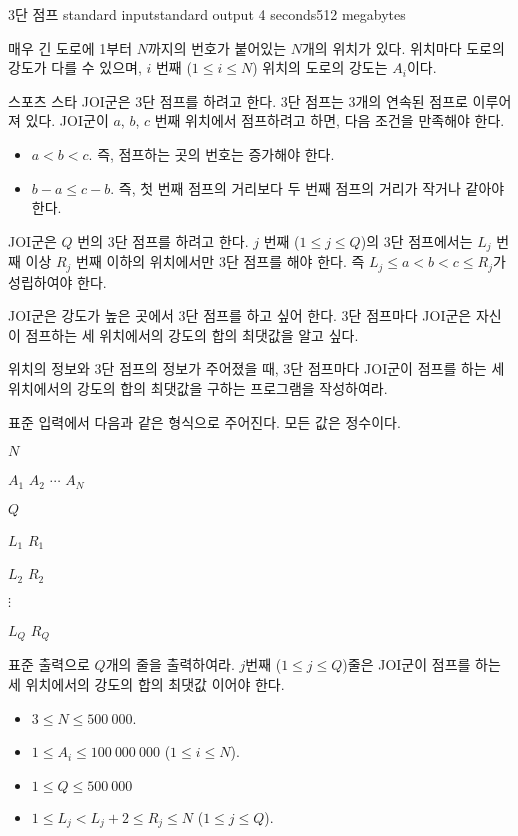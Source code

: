 \begin{problem}{3단 점프}
	{standard input}{standard output}
	{4 seconds}{512 megabytes}{}
	
	매우 긴 도로에 1부터 $N$까지의 번호가 붙어있는 $N$개의 위치가 있다. 위치마다 도로의 강도가 다를 수 있으며, $i$ 번째 ($1 \le i \le N$) 위치의 도로의 강도는 $A_i$이다.
	
	스포츠 스타 JOI군은 3단 점프를 하려고 한다. 3단 점프는 3개의 연속된 점프로 이루어져 있다. JOI군이 $a$, $b$, $c$ 번째 위치에서 점프하려고 하면, 다음 조건을 만족해야 한다.
	
	\begin{itemize}
		\item $a<b<c$. 즉, 점프하는 곳의 번호는 증가해야 한다.
		\item $b-a \le c-b$. 즉, 첫 번째 점프의 거리보다 두 번째 점프의 거리가 작거나 같아야 한다.
	\end{itemize}

	JOI군은 $Q$ 번의 3단 점프를 하려고 한다. $j$ 번째 ($1 \le j \le Q$)의 3단 점프에서는 $L_j$ 번째 이상 $R_j$ 번째 이하의 위치에서만 3단 점프를 해야 한다. 즉 $L_j \le a < b < c \le R_j$가 성립하여야 한다.
	
	JOI군은 강도가 높은 곳에서 3단 점프를 하고 싶어 한다. 3단 점프마다 JOI군은 자신이 점프하는 세 위치에서의 강도의 합의 최댓값을 알고 싶다.
	
	위치의 정보와 3단 점프의 정보가 주어졌을 때, 3단 점프마다 JOI군이 점프를 하는 세 위치에서의 강도의 합의 최댓값을 구하는 프로그램을 작성하여라.
	
	
	\InputFile
	
	표준 입력에서 다음과 같은 형식으로 주어진다. 모든 값은 정수이다.

	$N$
	
	$A_1$ $A_2$ $\cdots$ $A_N$
	
	$Q$
	
	$L_1$ $R_1$
	
	$L_2$ $R_2$
	
	$\vdots$
	
	$L_Q$ $R_Q$
	
	\OutputFile
	
	표준 출력으로 $Q$개의 줄을 출력하여라. $j$번째 ($1 \le j \le Q$)줄은 JOI군이 점프를 하는 세 위치에서의 강도의 합의 최댓값 이어야 한다.
	
	\Constraints
	
	\begin{itemize}
	
	\item $3 \le N \le 500\ 000$.
	\item $1 \le A_i \le 100\ 000\ 000$ ($1 \le i \le N$).
	\item $1 \le Q \le 500\ 000$
	\item $1 \le L_j < L_j + 2 \le R_j \le N$ ($1 \le j \le Q$).
		

\end{itemize}
\end{problem}

